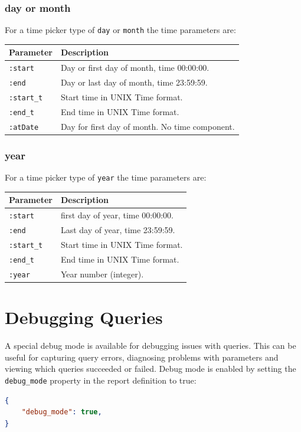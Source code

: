 \documentclass[a4paper,10pt]{book}
\begin{document}
\subsubsection{day or month}
For a time picker type of \verb|day| or \verb|month| the time parameters are:

\begin{tabular}{p{2.5cm} l}
\hline
\textbf{Parameter} & \textbf{Description} \\
\hline
\verb|:start| & Day or first day of month, time 00:00:00.\\
\verb|:end| & Day or last day of month, time 23:59:59.\\
\verb|:start_t| & Start time in UNIX Time format.\\
\verb|:end_t| & End time in UNIX Time format.\\
\verb|:atDate| & Day for first day of month. No time component.\\
\hline
\end{tabular}

\subsubsection{year}
For a time picker type of \verb|year| the time parameters are:

\begin{tabular}{p{2.5cm} l}
\hline
\textbf{Parameter} & \textbf{Description} \\
\hline
\verb|:start| & first day of year, time 00:00:00.\\
\verb|:end| & Last day of year, time 23:59:59.\\
\verb|:start_t| & Start time in UNIX Time format.\\
\verb|:end_t| & End time in UNIX Time format.\\
\verb|:year| & Year number (integer).\\
\hline
\end{tabular}

\section{Debugging Queries}
A special debug mode is available for debugging issues with queries. This can be useful for capturing query errors, diagnosing problems with parameters and viewing which queries succeeded or failed. Debug mode is enabled by setting the \verb|debug_mode| property in the report definition to true:
\begin{lstlisting}[language=json]
{
	"debug_mode": true,
}
\end{lstlisting}
\end{document}
